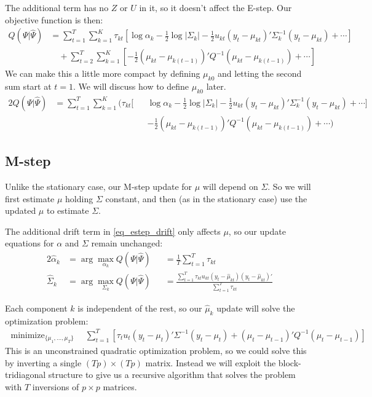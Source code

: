 \documentclass[11pt]{article}
\DeclareMathOperator*{\minimize}{minimize}
\begin{document}
The additional term has no $Z$ or $U$ in it, so it doesn't affect the E-step. Our objective function is then:
\begin{align*}
	Q(\Psi | \hat\Psi) &= \sum_{t=1}^T \sum_{k=1}^K \tau_{kt} \left[
		\log \alpha_k - \frac12 \log |\Sigma_k| 
		- \frac12u_{kt}(y_t - \mu_{kt})' \Sigma_k^{-1} (y_t - \mu_{kt})
		+ \cdots \right]
		\nonumber \\
	&\quad + \sum_{t=2}^T\sum_{k=1}^K \left[ - \frac12(\mu_{kt} - \mu_{k(t-1)})' Q^{-1} (\mu_{kt} - \mu_{k(t-1)})
		+ \cdots \right]
\end{align*}
We can make this a little more compact by defining $\mu_{k0}$ and letting the second sum start at $t=1$. We will discuss how to define $\mu_{k0}$ later.
\begin{alignat}{2}
	Q(\Psi | \hat\Psi) &= \sum_{t=1}^T \sum_{k=1}^K \bigg( \tau_{kt} \Big[&
		&\log \alpha_k - \frac12 \log |\Sigma_k| 
		- \frac12u_{kt}(y_t - \mu_{kt})' \Sigma_k^{-1} (y_t - \mu_{kt}) + \cdots \Big]
		\nonumber \\
	& & & - \frac12(\mu_{kt} - \mu_{k(t-1)})' Q^{-1} (\mu_{kt} - \mu_{k(t-1)})
		+ \cdots \bigg)
	\label{eq_estep_drift}
\end{alignat}

\subsection{M-step}

Unlike the stationary case, our M-step update for $\mu$ will depend on $\Sigma$. So we will first estimate $\mu$ holding $\Sigma$ constant, and then (as in the stationary case) use the updated $\mu$ to estimate $\Sigma$.

The additional drift term in \eqref{eq_estep_drift} only affects $\mu$, so our update equations for $\alpha$ and $\Sigma$ remain unchanged:
\begin{alignat}{2}
	\hat\alpha_k &= \arg\max_{\alpha_k} Q(\Psi | \hat\Psi) &
		&= \frac{1}{T} \sum_{t=1}^T \tau_{kt} \\
	\hat\Sigma_k &= \arg\max_{\Sigma_k} Q(\Psi | \hat\Psi) &
		&= \frac{\sum_{t=1}^T \tau_{kt} u_{kt} (y_t - \hat\mu_{kt})(y_t - \hat\mu_{kt})'}
			{\sum_{t=1}^T \tau_{kt}}
\end{alignat}

Each component $k$ is independent of the rest, so our $\hat\mu_k$ update will solve the optimization problem:
\begin{align}
	\minimize_{\{\mu_1, \dotsc, \mu_T\}} \quad 
	\sum_{t=1}^T \left[ \tau_{t} u_{t} (y_t - \mu_{t})' \Sigma^{-1} (y_t-\mu_{t}) 
	+ (\mu_{t} - \mu_{t-1})' Q^{-1} (\mu_{t} - \mu_{t-1}) \right]
	\label{eq_opt_obj}
\end{align}
This is an unconstrained quadratic optimization problem, so we could solve this by inverting a single $(Tp) \times (Tp)$ matrix. Instead we will exploit the block-tridiagonal structure to give us a recursive algorithm that solves the problem with $T$ inversions of $p \times p$ matrices.
\end{document}
